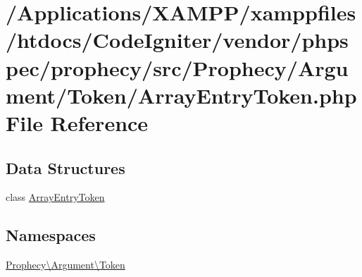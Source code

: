 \hypertarget{_array_entry_token_8php}{}\section{/\+Applications/\+X\+A\+M\+P\+P/xamppfiles/htdocs/\+Code\+Igniter/vendor/phpspec/prophecy/src/\+Prophecy/\+Argument/\+Token/\+Array\+Entry\+Token.php File Reference}
\label{_array_entry_token_8php}
\subsection*{Data Structures}
\begin{DoxyCompactItemize}
\item 
class \mbox{\hyperlink{class_prophecy_1_1_argument_1_1_token_1_1_array_entry_token}{Array\+Entry\+Token}}
\end{DoxyCompactItemize}
\subsection*{Namespaces}
\begin{DoxyCompactItemize}
\item 
 \mbox{\hyperlink{namespace_prophecy_1_1_argument_1_1_token}{Prophecy\textbackslash{}\+Argument\textbackslash{}\+Token}}
\end{DoxyCompactItemize}
